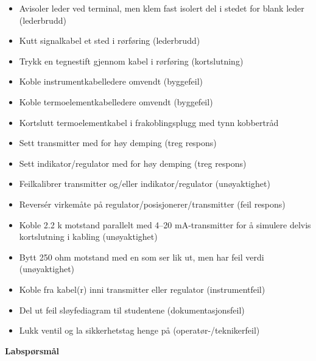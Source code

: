 \begin{itemize}
\item{} Avisoler leder ved terminal, men klem fast isolert del i stedet for blank leder (lederbrudd)
\item{} Kutt signalkabel et sted i rørføring (lederbrudd)
\item{} Trykk en tegnestift gjennom kabel i rørføring (kortslutning)
\item{} Koble instrumentkabelledere omvendt (byggefeil)
\item{} Koble termoelementkabelledere omvendt (byggefeil)
\item{} Kortslutt termoelementkabel i frakoblingsplugg med tynn kobbertråd
\item{} Sett transmitter med for høy demping (treg respons)
\item{} Sett indikator/regulator med for høy demping (treg respons)
\item{} Feilkalibrer transmitter og/eller indikator/regulator (unøyaktighet)
\item{} Reversér virkemåte på regulator/posisjonerer/transmitter (feil respons)
\item{} Koble 2.2 k motstand parallelt med 4--20 mA-transmitter for å simulere delvis kortslutning i kabling (unøyaktighet)
\item{} Bytt 250 ohm motstand med en som ser lik ut, men har feil verdi (unøyaktighet)
\item{} Koble fra kabel(r) inni transmitter eller regulator (instrumentfeil)
\item{} Del ut feil sløyfediagram til studentene (dokumentasjonsfeil)
\item{} Lukk ventil og la sikkerhetstag henge på (operatør-/teknikerfeil)
\end{itemize}






\vfil \eject

\noindent
{\bf Labspørsmål}

